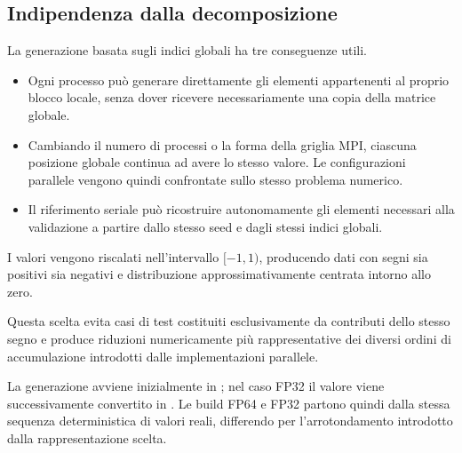 \subsection{Indipendenza dalla decomposizione}

La generazione basata sugli indici globali ha tre conseguenze utili.

\begin{itemize}
    \item Ogni processo può generare direttamente gli elementi appartenenti
    al proprio blocco locale, senza dover ricevere necessariamente una copia
    della matrice globale.

    \item Cambiando il numero di processi o la forma della griglia MPI,
    ciascuna posizione globale continua ad avere lo stesso valore. Le
    configurazioni parallele vengono quindi confrontate sullo stesso
    problema numerico.

    \item Il riferimento seriale può ricostruire autonomamente gli elementi
    necessari alla validazione a partire dallo stesso seed e dagli stessi
    indici globali.
\end{itemize}

I valori vengono riscalati nell'intervallo $[-1,1)$, producendo dati con
segni sia positivi sia negativi e distribuzione approssimativamente
centrata intorno allo zero.

Questa scelta evita casi di test costituiti esclusivamente da contributi
dello stesso segno e produce riduzioni numericamente più rappresentative
dei diversi ordini di accumulazione introdotti dalle implementazioni
parallele.

La generazione avviene inizialmente in ; nel caso FP32 il
valore viene successivamente convertito in . Le build FP64 e
FP32 partono quindi dalla stessa sequenza deterministica di valori reali,
differendo per l'arrotondamento introdotto dalla rappresentazione scelta.